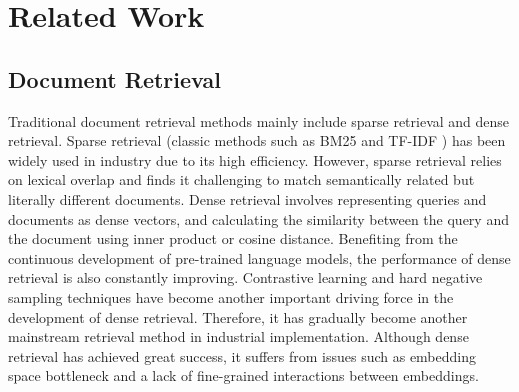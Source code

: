 \section{Related Work}
\subsection{Document Retrieval}
Traditional document retrieval methods mainly include sparse retrieval and dense retrieval.
Sparse retrieval (classic methods such as BM25 \cite{BM25} and TF-IDF \cite{TFIDF}) has been widely used in industry due to its high efficiency.
However, sparse retrieval relies on lexical overlap and finds it challenging to match semantically related but literally different documents.
Dense retrieval involves representing queries and documents as dense vectors\cite{dense1}, and calculating the similarity between the query and the document using inner product or cosine distance. 
Benefiting from the continuous development of pre-trained language models, the performance of dense retrieval is also constantly improving. Contrastive learning\cite{contrastive1, contrastive2} and hard negative sampling techniques \cite{ANCE,DPR,SentenceT5,GTR-base} have become another important driving force in the development of dense retrieval.
Therefore, it has gradually become another mainstream retrieval method in industrial implementation. Although dense retrieval has achieved great success, it suffers from issues such as embedding space bottleneck and a lack of fine-grained interactions between embeddings. 
